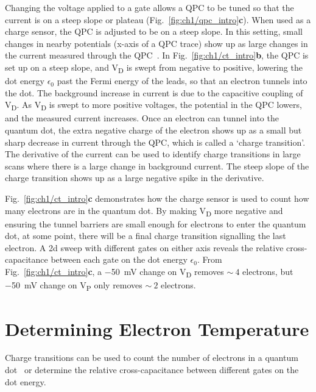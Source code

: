 Changing the voltage applied to a gate allows a QPC to be tuned so that the current is on a steep slope or plateau (Fig.~\ref{fig:ch1/qpc_intro}\textbf{c}). When used as a charge sensor, the QPC is adjusted to be on a steep slope. In this setting, small changes in nearby potentials (x-axis of a QPC trace) show up as large changes in the current measured through the QPC~\cite{cs_design}. In Fig.~\ref{fig:ch1/ct_intro}\textbf{b}, the QPC is set up on a steep slope, and V\textsubscript{D} is swept from negative to positive, lowering the dot energy $\epsilon_0$ past the Fermi energy of the leads, so that an electron tunnels into the dot. The background increase in current is due to the capacitive coupling of V\textsubscript{D}. As V\textsubscript{D} is swept to more positive voltages, the potential in the QPC lowers, and the measured current increases. Once an electron can tunnel into the quantum dot, the extra negative charge of the electron shows up as a small but sharp decrease in current through the QPC, which is called a `charge transition'. The derivative of the current can be used to identify charge transitions in large scans where there is a large change in background current. The steep slope of the charge transition shows up as a large negative spike in the derivative. 

Fig.~\ref{fig:ch1/ct_intro}\textbf{c} demonstrates how the charge sensor is used to count how many electrons are in the quantum dot. By making V\textsubscript{D} more negative and ensuring the tunnel barriers are small enough for electrons to enter the quantum dot, at some point, there will be a final charge transition signalling the last electron. A 2d sweep with different gates on either axis reveals the relative cross-capacitance between each gate on the dot energy $\epsilon_0$. From Fig.~\ref{fig:ch1/ct_intro}\textbf{c}, a \qty{-50}{mV} change on V\textsubscript{D} removes $\sim~4$ electrons, but \qty{-50}{mV} change on V\textsubscript{P} only removes $\sim~2$ electrons.



\section{Determining Electron Temperature}



Charge transitions can be used to count the number of electrons in a quantum dot~\cite{electron_counting} or determine the relative cross-capacitance between different gates on the dot energy.

